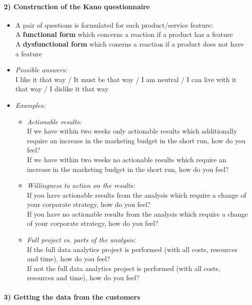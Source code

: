 \documentclass[a4paper, landscape, 6pt, fleqn]{scrartcl}
\renewcommand{\emph}[1]{\textbf{#1}}
\begin{document}
\begin{multicols*}{4}
\paragraph{2) Construction of the Kano questionnaire}

\begin{itemize}
\item A pair of questions is formulated for each product/service feature: \\
A \emph{functional form} which concerns a reaction if a product has a feature \\
A \emph{dysfunctional form} which conerns a reaction if a product does not have a feature
\item \textit{Possible answers:} \\
I like it that way / It must be that way / I am neutral / I can live with it that way / I dislike it that way
\item \textit{Examples:}
\begin{itemize}
\item \textit{Actionable results:} \\
If we have within two weeks only actionable results which additionally require an increase in the marketing budget in the short run, how do you feel? \\
If we have within two weeks no actionable results which require an increase in the marketing budget in the short run, how do you feel?
\item \textit{Willingness to action on the results:} \\
If you have actionable results from the analysis which require a change of your corporate strategy, how do you feel? \\
If you have no actionable results from the analysis which require a change of your corporate strategy, how do you feel?
\item \textit{Full project vs. parts of the analysis:} \\
If the full data analytics project is performed (with all costs, resources and time), how do you feel? \\
If not the full data analytics project is performed (with all costs, resources and time), how do you feel?
\end{itemize}
\end{itemize}

\paragraph{3) Getting the data from the customers}


\end{multicols*}
\end{document}
